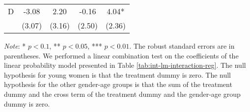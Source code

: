 \documentclass[12pt, a4paper]{article}
\begin{document}
\begin{table}[H]
\begin{threeparttable}
\begin{tabular}[t]{lcccc}
\hspace{1em}D & -3.08 & 2.20 & -0.16 & 4.04*\\
\hspace{1em} & (3.07) & (3.16) & (2.50) & (2.36)\\
\bottomrule
\end{tabular}
\begin{tablenotes}
\item \emph{Note}: * $p < 0.1$, ** $p < 0.05$, *** $p < 0.01$. The robust standard errors are in parentheses. We performed a linear combination test on the coefficients of the linear probability model presented in Table \ref{tab:int-lm-interaction-reg}. The null hypothesis for young women is that the treatment dummy is zero. The null hypothesis for the other gender-age groups is that the sum of the treatment dummy and the cross term of the treatment dummy and the gender-age group dummy is zero.
\end{tablenotes}
\end{threeparttable}
\end{table}
\end{document}
